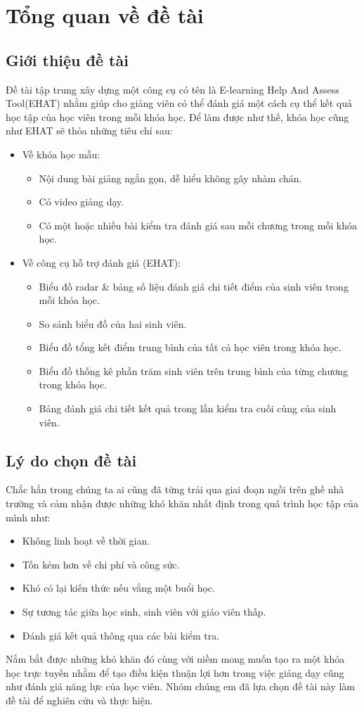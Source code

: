 \fontsize{13}{5}\selectfont
\setcounter{chapter}{0}
\chapter{Tổng quan về đề tài}
\section{Giới thiệu đề tài}
Đề tài tập trung xây dựng một công cụ có tên là E-learning Help And Assess Tool(EHAT) nhằm giúp cho giảng viên có thể đánh giá một cách cụ thể kết quả học tập của học viên trong mỗi khóa học. Để làm được như thế, khóa học cũng như EHAT sẽ thỏa những tiêu chí sau:
\begin{itemize}
	\item Về khóa học mẫu:
	\begin{itemize}
		\item Nội dung bài giảng ngắn gọn, dễ hiểu không gây nhàm chán.
		\item Có video giảng dạy.
		\item Có một hoặc nhiều bài kiểm tra đánh giá sau mỗi chương trong mỗi khóa học.
	\end{itemize}
	\item Về công cụ hỗ trợ đánh giá (EHAT):
	\begin{itemize}
		\item Biểu đồ radar \& bảng số liệu đánh giá chi tiết điểm của sinh viên trong mỗi khóa học.
		\item So sánh biểu đồ của hai sinh viên.
		\item Biểu đồ tổng kết điểm trung bình của tất cả học viên trong khóa học.
		\item Biểu đồ thống kê phần trăm sinh viên trên trung bình của từng chương trong khóa học.
		\item Bảng đánh giá chi tiết kết quả trong lần kiểm tra cuối cùng của sinh viên.
	\end{itemize}
\end{itemize}

\section{Lý do chọn đề tài}
Chắc hẳn trong chúng ta ai cũng đã từng trải qua giai đoạn ngồi trên ghế nhà trường và cảm nhận được những khó khăn nhất định trong quá trình học tập của mình như:
\begin{itemize}
	\item Không linh hoạt về thời gian.
	\item Tốn kém hơn về chi phí và công sức.
	\item Khó có lại kiến thức nếu vắng một buổi học.
	\item Sự tương tác giữa học sinh, sinh viên với giáo viên thấp.
	\item Đánh giá kết quả thông qua các bài kiểm tra.
\end{itemize}
Nắm bắt được những khó khăn đó cùng với niềm mong muốn tạo ra một khóa học trực tuyến nhằm để tạo điều kiện thuận lợi hơn trong việc giảng dạy cũng như đánh giá năng lực của học viên. Nhóm chúng em đã lựa chọn đề tài này làm đề tài để nghiên cứu và thực hiện.

